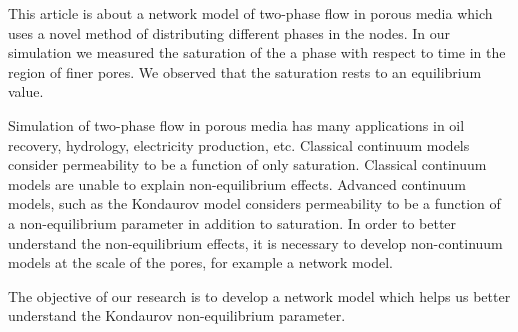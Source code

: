 This article is about a network model of two-phase flow in porous media which uses a novel method of distributing different phases in the nodes. In our simulation we measured the saturation of the a phase with respect to time in the region of finer pores. We observed that the saturation rests to an equilibrium value. 

Simulation of two-phase flow in porous media has many applications in oil recovery, hydrology, electricity production, etc. Classical continuum models consider permeability to be a function of only saturation. Classical continuum models are unable to explain non-equilibrium effects. Advanced continuum models, such as the Kondaurov model considers permeability to be a function of a non-equilibrium parameter in addition to saturation. In order to better understand the non-equilibrium effects, it is necessary to develop non-continuum models at the scale of the pores, for example a network model.

The objective of our research is to develop a network model which helps us better understand the Kondaurov non-equilibrium parameter. 

